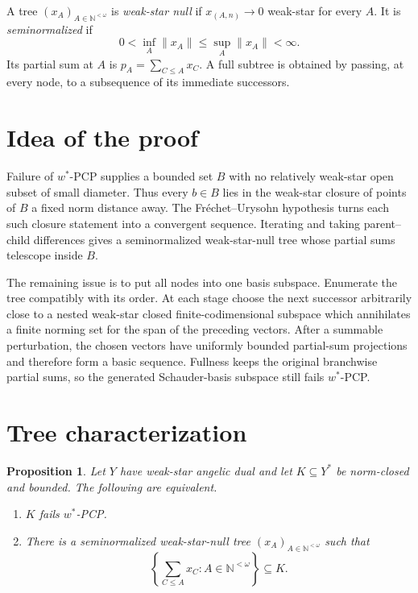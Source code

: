 \documentclass[11pt]{article}
\newtheorem{proposition}[theorem]{Proposition}
\newcommand{\N}{\mathbb N}
\begin{document}
A tree $(x_A)_{A\in\N^{<\omega}}$ is \emph{weak-star null} if
$x_{(A,n)}\to0$ weak-star for every $A$.  It is \emph{seminormalized} if
\[
0<\inf_A\|x_A\|\leq \sup_A\|x_A\|<\infty.
\]
Its partial sum at $A$ is $p_A=\sum_{C\leq A}x_C$.  A full subtree is obtained
by passing, at every node, to a subsequence of its immediate successors.

\section*{Idea of the proof}

Failure of $w^*$-PCP supplies a bounded set $B$ with no relatively weak-star
open subset of small diameter.  Thus every $b\in B$ lies in the weak-star
closure of points of $B$ a fixed norm distance away.  The
Fr\'echet--Urysohn hypothesis turns each such closure statement into a
convergent sequence.  Iterating and taking parent--child differences gives a
seminormalized weak-star-null tree whose partial sums telescope inside $B$.

The remaining issue is to put all nodes into one basis subspace.  Enumerate
the tree compatibly with its order.  At each stage choose the next successor
arbitrarily close to a nested weak-star closed finite-codimensional subspace
which annihilates a finite norming set for the span of the preceding vectors.
After a summable perturbation, the chosen vectors have uniformly bounded
partial-sum projections and therefore form a basic sequence.  Fullness keeps
the original branchwise partial sums, so the generated Schauder-basis
subspace still fails $w^*$-PCP.

\section*{Tree characterization}

\begin{proposition}\label{prop:tree}
Let $Y$ have weak-star angelic dual and let $K\subseteq Y^*$ be norm-closed
and bounded.  The following are equivalent.
\begin{enumerate}
\item $K$ fails $w^*$-PCP.
\item There is a seminormalized weak-star-null tree
$(x_A)_{A\in\N^{<\omega}}$ such that
\[
\left\{\sum_{C\leq A}x_C:A\in\N^{<\omega}\right\}\subseteq K.
\]
\end{enumerate}
\end{proposition}
\end{document}
